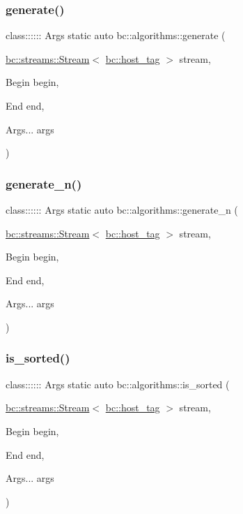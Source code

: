 \subsubsection{\texorpdfstring{generate()}{generate()}}
{\footnotesize\ttfamily class\+:::::: Args static auto bc\+::algorithms\+::generate (\begin{DoxyParamCaption}\item[{\hyperlink{classbc_1_1streams_1_1Stream}{bc\+::streams\+::\+Stream}$<$ \hyperlink{structbc_1_1host__tag}{bc\+::host\+\_\+tag} $>$}]{stream,  }\item[{Begin}]{begin,  }\item[{End}]{end,  }\item[{Args...}]{args }\end{DoxyParamCaption})}

\mbox{\label{namespacebc_1_1algorithms_a327b4d58fa795cac167a69a3450791a5}} 
\subsubsection{\texorpdfstring{generate\+\_\+n()}{generate\_n()}}
{\footnotesize\ttfamily class\+:::::: Args static auto bc\+::algorithms\+::generate\+\_\+n (\begin{DoxyParamCaption}\item[{\hyperlink{classbc_1_1streams_1_1Stream}{bc\+::streams\+::\+Stream}$<$ \hyperlink{structbc_1_1host__tag}{bc\+::host\+\_\+tag} $>$}]{stream,  }\item[{Begin}]{begin,  }\item[{End}]{end,  }\item[{Args...}]{args }\end{DoxyParamCaption})}

\mbox{\label{namespacebc_1_1algorithms_a594cc8e5bcd2484bd994f4301cc5f448}} 
\subsubsection{\texorpdfstring{is\+\_\+sorted()}{is\_sorted()}}
{\footnotesize\ttfamily class\+:::::: Args static auto bc\+::algorithms\+::is\+\_\+sorted (\begin{DoxyParamCaption}\item[{\hyperlink{classbc_1_1streams_1_1Stream}{bc\+::streams\+::\+Stream}$<$ \hyperlink{structbc_1_1host__tag}{bc\+::host\+\_\+tag} $>$}]{stream,  }\item[{Begin}]{begin,  }\item[{End}]{end,  }\item[{Args...}]{args }\end{DoxyParamCaption})}

